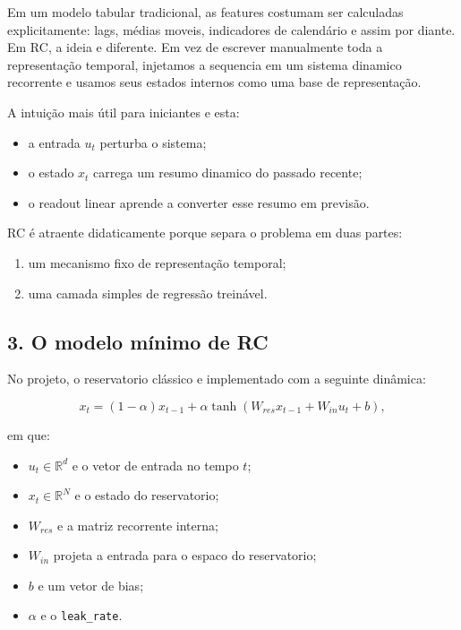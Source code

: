 \documentclass[12pt]{article}
\providecommand{\tightlist}{%
          \setlength{\itemsep}{0pt}\setlength{\parskip}{0pt}}
\begin{document}
Em um modelo tabular tradicional, as features costumam ser calculadas explicitamente: lags, médias moveis, indicadores de calendário e assim por diante. Em RC, a ideia e diferente. Em vez de escrever manualmente toda a representação temporal, injetamos a sequencia em um sistema dinamico recorrente e usamos seus estados internos como uma base de representação.

A intuição mais útil para iniciantes e esta:

\begin{itemize}
\tightlist
\item
  a entrada \(u_t\) perturba o sistema;
\item
  o estado \(x_t\) carrega um resumo dinamico do passado recente;
\item
  o readout linear aprende a converter esse resumo em previsão.
\end{itemize}

RC é atraente didaticamente porque separa o problema em duas partes:

\begin{enumerate}
\def\labelenumi{\arabic{enumi}.}
\tightlist
\item
  um mecanismo fixo de representação temporal;
\item
  uma camada simples de regressão treinável.
\end{enumerate}

\subsection{3. O modelo mínimo de RC}\label{3-o-modelo-muxednimo-de-rc}

No projeto, o reservatorio clássico e implementado com a seguinte dinâmica:

\[
x_t = (1 - \alpha) x_{t-1} + \alpha \tanh(W_{res} x_{t-1} + W_{in} u_t + b),
\]

em que:

\begin{itemize}
\tightlist
\item
  \(u_t \in \mathbb{R}^d\) e o vetor de entrada no tempo \(t\);
\item
  \(x_t \in \mathbb{R}^N\) e o estado do reservatorio;
\item
  \(W_{res}\) e a matriz recorrente interna;
\item
  \(W_{in}\) projeta a entrada para o espaco do reservatorio;
\item
  \(b\) e um vetor de bias;
\item
  \(\alpha\) e o \texttt{leak\_rate}.
\end{itemize}
\end{document}
